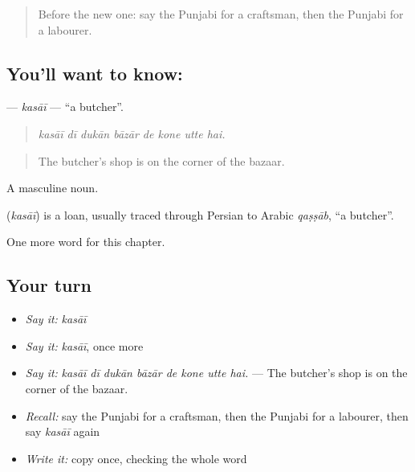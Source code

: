 \label{lesson:PA-C336-kasai}



\begin{quote}
Before the new one: say the Punjabi for a craftsman, then the Punjabi for a labourer.
\end{quote}

\subsection*{You'll want to know: }
\textbf{} — \emph{kasāī} — \textquotedblleft{}a butcher\textquotedblright{}.

\begin{quote}
       
\end{quote}

\begin{quote}
\emph{kasāī dī dukān bāzār de kone utte hai.}
\end{quote}

\begin{quote}
The butcher's shop is on the corner of the bazaar.
\end{quote}

A masculine noun.

\begin{cousinweb}
\textbf{} (\emph{kasāī}) is a loan, usually traced through Persian to Arabic \emph{qaṣṣāb}, \textquotedblleft{}a butcher\textquotedblright{}.
\end{cousinweb}

\begin{grammarlens}[title={What you've built}]
One more word for this chapter.
\end{grammarlens}

\subsection*{Your turn}
\begin{itemize}
\raggedright
  \item \emph{Say it:} \emph{kasāī}
  \item \emph{Say it:} \emph{kasāī}, once more
  \item \emph{Say it:} \emph{kasāī dī dukān bāzār de kone utte hai.} — The butcher's shop is on the corner of the bazaar.
  \item \emph{Recall:} say the Punjabi for a craftsman, then the Punjabi for a labourer, then say \emph{kasāī} again
  \item \emph{Write it:} copy \textbf{} once, checking the whole word
\end{itemize}

